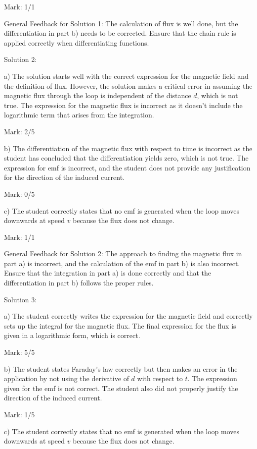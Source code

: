 \documentclass[a4paper,11pt]{article}
\begin{document}
Mark: 1/1

General Feedback for Solution 1: The calculation of flux is well done, but the differentiation in part b) needs to be corrected. Ensure that the chain rule is applied correctly when differentiating functions.

Solution 2:

a) The solution starts well with the correct expression for the magnetic field and the definition of flux. However, the solution makes a critical error in assuming the magnetic flux through the loop is independent of the distance \(d\), which is not true. The expression for the magnetic flux is incorrect as it doesn't include the logarithmic term that arises from the integration.

Mark: 2/5

b) The differentiation of the magnetic flux with respect to time is incorrect as the student has concluded that the differentiation yields zero, which is not true. The expression for emf is incorrect, and the student does not provide any justification for the direction of the induced current.

Mark: 0/5

c) The student correctly states that no emf is generated when the loop moves downwards at speed \(v\) because the flux does not change.

Mark: 1/1

General Feedback for Solution 2: The approach to finding the magnetic flux in part a) is incorrect, and the calculation of the emf in part b) is also incorrect. Ensure that the integration in part a) is done correctly and that the differentiation in part b) follows the proper rules.

Solution 3:

a) The student correctly writes the expression for the magnetic field and correctly sets up the integral for the magnetic flux. The final expression for the flux is given in a logarithmic form, which is correct.

Mark: 5/5

b) The student states Faraday's law correctly but then makes an error in the application by not using the derivative of \(d\) with respect to \(t\). The expression given for the emf is not correct. The student also did not properly justify the direction of the induced current.

Mark: 1/5

c) The student correctly states that no emf is generated when the loop moves downwards at speed \(v\) because the flux does not change.
\end{document}
